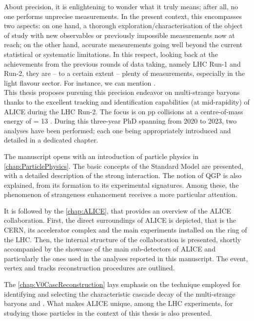 About precision, it is enlightening to wonder what it truly means; after all, no one performs unprecise measurements. In the present context, this encompasses two aspects: on one hand, a thorough exploration/characterisation of the object of study with new observables or previously impossible measurements now at reach; on the other hand, accurate measurements going well beyond the current statistical or systematic limitations.
In this respect, looking back at the achievements from the previous rounds of data taking, namely LHC Run-1 and Run-2, they are -- to a certain extent -- plenty of measurements, especially in the light flavour sector. For instance, we can mention \cite{alicecollaborationCharacterizingInitialConditions2022}\cite{schotterMultidifferentialInvestigationStrangeness2023}\cite{schotterQCDLHC2022}.\\

This thesis proposes pursuing this precision endeavor on multi-strange baryons thanks to the excellent tracking and identification capabilities (at mid-rapidity) of ALICE during the LHC Run-2. The focus is on pp collisions at a centre-of-mass energy of \sqrtS = 13 \tev. During this three-year PhD spanning from 2020 to 2023, two analyses have been performed; each one being appropriately introduced and detailed in a dedicated chapter.

The manuscript opens with an introduction of particle physics in \chap\ref{chap:ParticlePhysics}. The basic concepts of the Standard Model are presented, with a detailed description of the strong interaction. The notion of QGP is also explained, from its formation to its experimental signatures. Among these, the phenomenon of strangeness enhancement receives a more particular attention.

It is followed by the \chap\ref{chap:ALICE}, that provides an overview of the ALICE collaboration. First, the direct surroundings of ALICE is depicted, that is the CERN, its accelerator complex and the main experiments installed on the ring of the LHC. Then, the internal structure of the collaboration is presented, shortly accompanied by the showcase of the main sub-detectors of ALICE and particularly the ones used in the analyses reported in this manuscript. The event, vertex and tracks reconstruction procedures are outlined. 

The \chap\ref{chap:V0CascReconstruction} lays emphasis on the technique employed for identifying and selecting the characteristic cascade decay of the multi-strange baryons \rmXi and \rmOmega. What makes ALICE unique, among the LHC experiments, for studying those particles in the context of this thesis is also presented.

